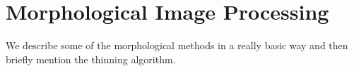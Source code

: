 \chapter{Morphological Image Processing}
We describe some of the morphological methods in a really basic way and then briefly mention the thinning algorithm.